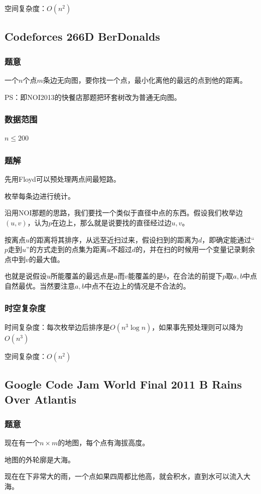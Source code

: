 \documentclass{ctexart}
\begin{document}
空间复杂度：$O(n^2)$
\subsection{Codeforces 266D BerDonalds}
\subsubsection{题意}
一个$n$个点$m$条边无向图，要你找一个点，最小化离他的最远的点到他的距离。

PS：即NOI2013的快餐店那题把环套树改为普通无向图。
\subsubsection{数据范围}
$n \le 200$
\subsubsection{题解}
先用Floyd可以预处理两点间最短路。

枚举每条边进行统计。

沿用NOI那题的思路，我们要找一个类似于直径中点的东西。假设我们枚举边$(u,v)$，认为$p$在边上，那么就是说要找的直径经过边$u,v$。

按离点$u$的距离将其排序，从远至近扫过来，假设扫到的距离为$d$，即确定能通过“$p$走到$u$”的方式走到的点集为距离$u$不超过$d$的，并在扫的时候用一个变量记录剩余点中到$v$的最大值。

也就是说假设$u$所能覆盖的最远点是$a$而$v$能覆盖的是$b$，在合法的前提下$p$取$a,b$中点自然最优。当然要注意$a,b$中点不在边上的情况是不合法的。
\subsubsection{时空复杂度}
时间复杂度：每次枚举边后排序是$O(n^3 \log n)$，如果事先预处理则可以降为$O(n^3)$

空间复杂度：$O(n^2)$
\subsection{Google Code Jam World Final 2011 B Rains Over Atlantis}
\subsubsection{题意}
现在有一个$n \times m$的地图，每个点有海拔高度。

地图的外轮廓是大海。

现在在下非常大的雨，一个点如果四周都比他高，就会积水，直到水可以流入大海。
\end{document}
